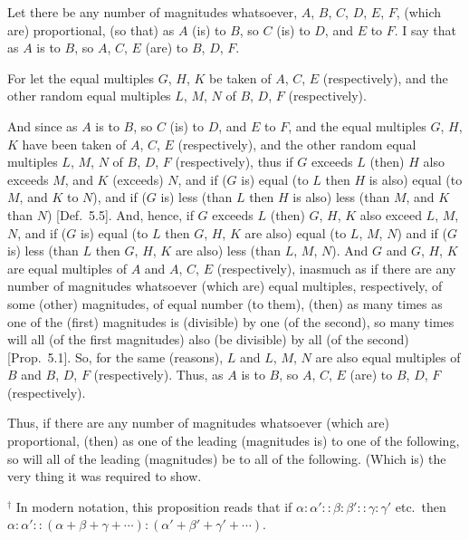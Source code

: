 \begin{Parallel}{}{}
{\epsfysize=1.3in
\centerline{}

Let there be any number of magnitudes whatsoever, 
$A$, $B$, $C$, $D$, $E$, $F$, (which are) proportional, (so that) as $A$ (is) to $B$, so $C$ (is) to $D$, and 
$E$ to $F$. I say that as $A$ is to $B$, so  $A$, $C$, $E$ (are) to  $B$, $D$, $F$.

For let the equal multiples $G$, $H$,  $K$ be taken of $A$, $C$, $E$
(respectively), and the other random equal multiples $L$, $M$,  $N$ of
$B$, $D$, $F$ (respectively).

And since as $A$ is to $B$, so $C$ (is) to $D$, and $E$ to $F$, and the equal multiples
$G$, $H$, $K$ have been taken of $A$, $C$,  $E$ (respectively), and the other
random equal multiples $L$, $M$,  $N$ of $B$, $D$,  $F$ (respectively), thus
if $G$ exceeds $L$ (then) $H$ also exceeds $M$, and $K$ (exceeds) $N$, and if ($G$ is)
equal (to $L$ then $H$ is also) equal (to $M$, and $K$  to $N$), and if ($G$ is) less (than $L$ then $H$ is also) less (than $M$, and $K$  than $N$)  [Def.~5.5].  And, hence, if $G$ exceeds $L$ (then)
$G$, $H$, $K$ also exceed $L$, $M$, $N$, and if ($G$ is) equal
(to $L$ then $G$, $H$, $K$ are also) equal (to  $L$, $M$, $N$) and if ($G$ is) less (than $L$ then
$G$, $H$, $K$ are also) less (than $L$, $M$, $N$). And $G$ and $G$, $H$, $K$ are equal multiples
of $A$ and $A$, $C$, $E$ (respectively), inasmuch as if there are any number of magnitudes whatsoever (which are)  equal multiples, respectively, of
some  (other) magnitudes,  of equal  number (to them), (then) as many times as one of the (first) magnitudes is (divisible) by one (of the second), so many times
will all (of the first magnitudes) also (be divisible) by all (of the second)
 [Prop.~5.1]. So, for the same (reasons), $L$
 and $L$, $M$, $N$ are also equal multiples of $B$ and $B$, $D$, $F$ (respectively). Thus,
 as $A$ is to $B$, so $A$, $C$, $E$ (are) to $B$, $D$, $F$ (respectively).
 
Thus, if there are any number  of magnitudes whatsoever
(which are) proportional, (then) as one of the leading (magnitudes is) to one of the following, so
will 
all of the leading (magnitudes) be to all of the following. (Which is) the
very thing it was required to show.}
\end{Parallel}
{\footnotesize \noindent$^\dag$ In modern notation, this proposition
reads that if $\alpha:\alpha'::\beta:\beta'::\gamma:\gamma'$ {\rm etc.}\ then
$\alpha:\alpha'::(\alpha+\beta+\gamma+\cdots):(\alpha'+\beta'+\gamma'+\cdots)$.}

